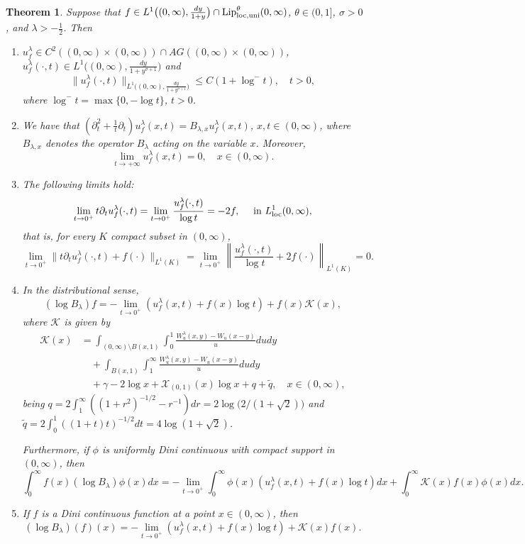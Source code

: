 \documentclass[a4paper,10pt, reqno]{amsart}
\newtheorem{thm}{Theorem}[section]
\theoremstyle{definition}
\theoremstyle{remark}
\numberwithin{equation}{section}
\begin{document}
\begin{thm}\label{thm: Th1.4}
Suppose that $f\in L^1\big((0,\infty),\frac{dy}{1+y}\big)\cap {\textup{Lip}}^\theta_{{\rm loc}, {\rm uni}}(0,\infty)$, $\theta\in (0,1]$, $\sigma>0$, and $\lambda> -\tfrac12$. Then 
\begin{enumerate}
    \item \label{itm: Th1.4 a} $u_f^\lambda \in C^2((0,\infty)\times (0,\infty))\cap AG((0,\infty)\times (0,\infty))$, $u_f^\lambda (\cdot , t)\in L^1\big((0,\infty),\frac{dy}{1+y^{\sigma +1}}\big)$ and 
    \[
    \|u_f^\lambda (\cdot ,t)\|_{L^1\big((0,\infty),\frac{dy}{1+y^{\sigma +1}}\big)}\leq C(1+\log^-t),\quad t>0,
    \]
where $\log^-t=\max\{0,-\log t\}$, $t>0$.

\item \label{itm: Th1.4 b} We have that $(\partial_t^2+\frac{1}{t}\partial_t)u_f^\lambda (x,t)=B_{\lambda ,x}u_f^\lambda(x,t)$, $x,t\in (0,\infty)$, where $B_{\lambda,x}$ denotes the operator $B_\lambda$ acting on the variable $x$. Moreover,
\[
\lim_{t\rightarrow +\infty}u_f^\lambda (x,t)=0,\quad x\in (0,\infty).
\]

\item \label{itm: Th1.4 c} The following limits hold:
\[
\lim_{t\to 0^+}t\partial_tu_f^\lambda(\cdot,t)=\lim_{t\rightarrow 0^+}\frac{u_f^\lambda (\cdot ,t)}{\log t}=-2 f,\quad \mbox{ in }L^1_{\rm loc}(0,\infty),
\]
that is, for every $K$ compact subset in $(0,\infty)$, 
\[
\lim_{t\rightarrow 0^+}\|t\partial_tu_f^\lambda(\cdot,t)+f(\cdot)\|_{L^1(K)}=\lim_{t\rightarrow 0^+}\left\|\frac{u_f^\lambda (\cdot ,t)}{\log t}+2 f(\cdot)\right\|_{L^1(K)}=0.
\]

\item \label{itm: Th1.4 d} In the distributional sense,
\[
( \log B_\lambda)f=-\lim_{t\rightarrow 0^+}(u_f^\lambda (x,t)+f(x)\log t)+f(x)\mathcal K(x),
\]
where $\mathcal K$ is given by
\begin{align*}
    \mathcal K(x)&=\int_{(0,\infty)\setminus B(x,1)}\int_0^1\frac{W_u^\lambda (x,y)-W_u(x-y)}{u}dudy\\
    &\quad +\int_{B(x,1)}\int_1^\infty \frac{W_u^\lambda (x,y)-W_u(x-y)}{u}dudy\\
    &\quad +\gamma-2\log x+\mathcal X_{(0,1)}(x)\log x+q+\widetilde{q}, \quad x\in (0,\infty),
\end{align*}
being $q=2\int_1^\infty ((1+r^2)^{-1/2}-r^{-1})dr=2\log\big(2/(1+\sqrt{2})\big)$ and $\widetilde{q}=2\int_0^1((1+t)t)^{-1/2}dt=4\log(1+\sqrt{2})$.

Furthermore, if $\phi$ is uniformly Dini continuous with compact support in $(0,\infty)$, then
\[
\int_0^\infty f(x)(\log B_\lambda)\phi (x)dx=-\lim_{t\rightarrow 0^+}\int_0^\infty \phi(x)(u_f^\lambda (x,t)+f(x) \log t)dx+\int_0^\infty \mathcal K(x)f(x)\phi (x)dx.
\]

\item \label{itm: Th1.4 e} If $f$ is a Dini continuous function at a point $x\in (0,\infty)$, then
\[
(\log B_\lambda)(f)(x)=-\lim_{t\rightarrow 0^+}(u_f^\lambda (x,t)+f(x)\log t)+\mathcal K(x)f(x).
\]
\end{enumerate}
\end{thm}
\end{document}
